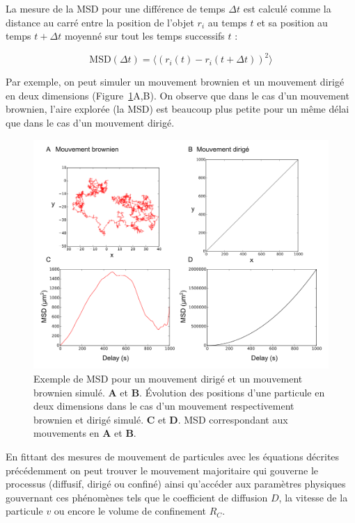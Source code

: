\documentclass[12pt,a4paper,twoside,openright]{book}
\begin{document}
La mesure de la MSD pour une différence de temps \(\Delta t\) est
calculé comme la distance au carré entre la position de l'objet \(r_i\)
au temps \(t\) et sa position au temps \(t+\Delta t\) moyenné sur tout
les temps successifs \(t\) :

\[
\mbox{MSD}(\Delta t) = \langle (r_i(t) - r_i(t + \Delta t)) ^ 2 \rangle
\]

Par exemple, on peut simuler un mouvement brownien et un mouvement
dirigé en deux dimensions (Figure~\ref{fig:motions}A,B). On observe que
dans le cas d'un mouvement brownien, l'aire explorée (la MSD) est
beaucoup plus petite pour un même délai que dans le cas d'un mouvement
dirigé.

\begin{figure}[htbp]
\centering
\includegraphics{figures/results/imaging/motions.png}
\caption{\label{fig:motions}Exemple de MSD pour un mouvement dirigé et
un mouvement brownien simulé. \textbf{A} et \textbf{B}. Évolution des
positions d'une particule en deux dimensions dans le cas d'un mouvement
respectivement brownien et dirigé simulé. \textbf{C} et \textbf{D}. MSD
correspondant aux mouvements en \textbf{A} et \textbf{B}.}
\end{figure}

En fittant des mesures de mouvement de particules avec les équations
décrites précédemment on peut trouver le mouvement majoritaire qui
gouverne le processus (diffusif, dirigé ou confiné) ainsi qu'accéder aux
paramètres physiques gouvernant ces phénomènes tels que le coefficient
de diffusion \(D\), la vitesse de la particule \(v\) ou encore le volume
de confinement \(R_C\).
\end{document}
